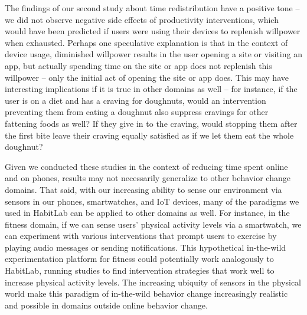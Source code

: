 The findings of our second study about time redistribution have a positive tone -- we did not observe negative side effects of productivity interventions, which would have been predicted if users were using their devices to replenish willpower when exhausted. Perhaps one speculative explanation is that in the context of device usage, diminished willpower results in the user opening a site or visiting an app, but actually spending time on the site or app does not replenish this willpower -- only the initial act of opening the site or app does. This may have interesting implications if it is true in other domains as well -- for instance, if the user is on a diet and has a craving for doughnuts, would an intervention preventing them from eating a doughnut also suppress cravings for other fattening foods as well? If they give in to the craving, would stopping them after the first bite leave their craving equally satisfied as if we let them eat the whole doughnut?

Given we conducted these studies in the context of reducing time spent online and on phones, results may not necessarily generalize to other behavior change domains. That said, with our increasing ability to sense our environment via sensors in our phones, smartwatches, and IoT devices, many of the paradigms we used in HabitLab can be applied to other domains as well. For instance, in the fitness domain, if we can sense users' physical activity levels via a smartwatch, we can experiment with various interventions that prompt users to exercise by playing audio messages or sending notifications. This hypothetical in-the-wild experimentation platform for fitness could potentially work analogously to HabitLab, running studies to find intervention strategies that work well to increase physical activity levels. The increasing ubiquity of sensors in the physical world make this paradigm of in-the-wild behavior change increasingly realistic and possible in domains outside online behavior change.

